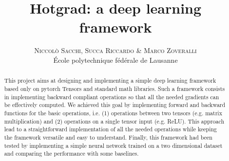 \documentclass[10pt,conference,compsocconf]{IEEEtran}
\begin{document}
        
\pretitle{\begin{center}\Huge\bfseries} %
\posttitle{\end{center}} %
\title{Hotgrad: a deep learning framework}
\author{
        \textsc{Niccol\`{o} Sacchi, Succa Riccardo \& Marco Zoveralli}
        \normalsize{} \\
        \normalsize \'{E}cole polytechnique f\'{e}d\'{e}rale de Lausanne
}
\maketitle
\begin{abstract}
This project aims at designing and implementing a simple deep learning framework based only on pytorch Tensors and standard math libraries. Such a framework consists in implementing backward compliant operations so that all the needed gradients can be effectively computed. We achieved this goal by implementing forward and backward functions for the basic operations, i.e. (1) operations between two tensors (e.g. matrix multiplication) and (2) operations on a single tensor input (e.g. ReLU). This approach lead to a straightforward implementation of all the needed operations while keeping the framework versatile and easy to understand.
Finally, this framework had been tested by implementing a simple neural network trained on a two dimensional dataset and comparing the performance with some baselines.
\end{abstract}
\end{document}
